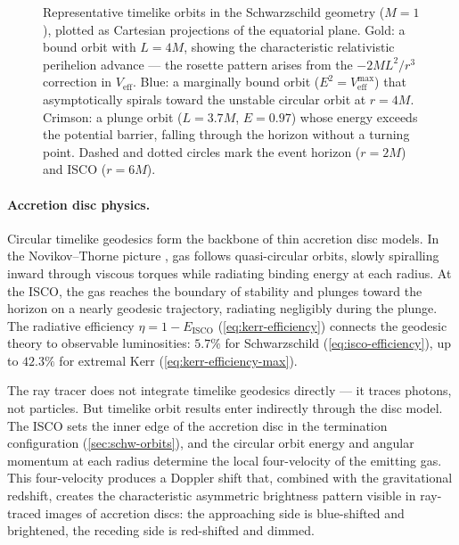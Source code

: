 \begin{figure}[htbp]
  \centering
  
  \caption[Representative timelike orbits in Schwarzschild]{%
    Representative timelike orbits in the Schwarzschild geometry
    ($M = 1$), plotted as Cartesian projections of the equatorial
    plane.  Gold: a bound orbit with $L = 4M$, showing the
    characteristic relativistic perihelion advance --- the rosette
    pattern arises from the $-2ML^2/r^3$ correction in
    $V_{\text{eff}}$.  Blue: a marginally bound orbit
    ($E^2 = V_{\text{eff}}^{\text{max}}$) that asymptotically
    spirals toward the unstable circular orbit at $r = 4M$.
    Crimson: a plunge orbit ($L = 3.7M$, $E = 0.97$) whose energy
    exceeds the potential barrier, falling through the horizon
    without a turning point.  Dashed and dotted circles mark the
    event horizon ($r = 2M$) and ISCO ($r = 6M$).}
  \label{fig:timelike-orbits}
\end{figure}

\paragraph{Accretion disc physics.}

Circular timelike geodesics form the backbone of thin accretion disc
models.  In the Novikov--Thorne picture
\cite{Novikov1973,Page1974}, gas follows quasi-circular orbits,
slowly spiralling inward through viscous torques while radiating
binding energy at each radius.  At the ISCO, the gas reaches the
boundary of stability and plunges toward the horizon on a nearly
geodesic trajectory, radiating negligibly during the plunge.  The
radiative efficiency $\eta = 1 - E_{\text{ISCO}}$
(\cref{eq:kerr-efficiency}) connects the geodesic theory to
observable luminosities: $5.7\%$ for Schwarzschild
(\cref{eq:isco-efficiency}), up to $42.3\%$ for extremal Kerr
(\cref{eq:kerr-efficiency-max}).

The ray tracer does not integrate timelike geodesics directly ---
it traces photons, not particles.  But timelike orbit results enter
indirectly through the disc model.  The ISCO sets the inner edge of
the accretion disc in the termination configuration
(\cref{sec:schw-orbits}), and the circular orbit energy and angular
momentum at each radius determine the local four-velocity of the
emitting gas.  This four-velocity produces a Doppler shift that,
combined with the gravitational redshift, creates the characteristic
asymmetric brightness pattern visible in ray-traced images of
accretion discs: the approaching side is blue-shifted and
brightened, the receding side is red-shifted and dimmed.
